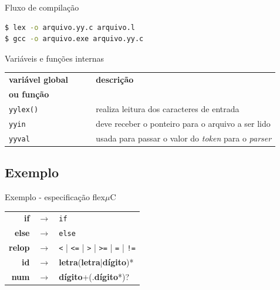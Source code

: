 \begin{frame}[fragile]{Fluxo de compilação}
\begin{lstlisting}[language=bash]
$ lex -o arquivo.yy.c arquivo.l
$ gcc -o arquivo.exe arquivo.yy.c
\end{lstlisting}\bigskip

\pause Variáveis e funções internas

 \center\small
 \begin{tabular}{ll}
   \toprule
   \bf variável global $\qquad$&  \bf descrição\\
   \bf ou função   & \\
   \midrule
   {\tt yylex()}  &  realiza leitura dos caracteres de entrada        \\
   {\tt yyin}     &  deve receber o ponteiro para o arquivo a ser lido \\
   {\tt yyval}    & usada para passar o valor do {\it token\/} para o {\it parser\/}\\
   \bottomrule
 \end{tabular}
\end{frame}

\subsection{Exemplo}
\frame{\tableofcontents[currentsubsection]}

\begin{frame}{Exemplo - especificação flex}{$\mu$C}
  \center
  \begin{tabular}{rrl}
    {\bf if} & $\rightarrow$ & {\tt if} \\
    {\bf else} & $\rightarrow$ & {\tt else} \\
    {\bf relop} & $\rightarrow$ & {\tt <} | {\tt <=} | {\tt >} | {\tt >=} | {\tt =} | {\tt !=} \\
    {\bf id}    & $\rightarrow$ & {\bf letra}({\bf letra}|{\bf dígito})* \\
    {\bf num}    & $\rightarrow$ & {\bf dígito}+(.{\bf dígito}*)? \\
   \end{tabular}
 \end{frame}

